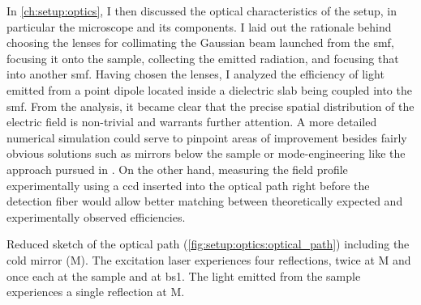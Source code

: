 In \cref{ch:setup:optics}, I then discussed the optical characteristics of the setup, in particular the microscope and its components.
I laid out the rationale behind choosing the lenses for collimating the Gaussian beam launched from the \gls{smf}, focusing it onto the sample, collecting the emitted radiation, and focusing that into another \gls{smf}.
Having chosen the lenses, I analyzed the efficiency of light emitted from a point dipole located inside a dielectric slab being coupled into the \gls{smf}.
From the analysis, it became clear that the precise spatial distribution of the electric field is non-trivial and warrants further attention.
A more detailed numerical simulation could serve to pinpoint areas of improvement besides fairly obvious solutions such as mirrors below the sample or mode-engineering like the approach pursued in .
On the other hand, measuring the field profile experimentally using a \gls{ccd} inserted into the optical path right before the detection fiber would allow better matching between theoretically expected and experimentally observed efficiencies.

\begin{marginfigure}[*-16]
    
    \caption[]{
        Reduced sketch of the optical path (\cf \cref{fig:setup:optics:optical_path}) including the cold mirror (M).
        The excitation laser experiences four reflections, twice at M and once each at the sample and at \acrshort{bs}1.
        The light emitted from the sample experiences a single reflection at M.
    }
    \label{fig:setup:conclusion:optical_path_reduced}
\end{marginfigure}


